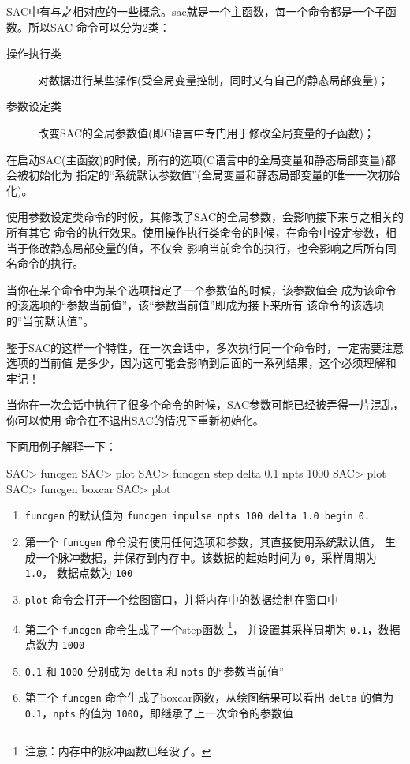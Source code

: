 SAC中有与之相对应的一些概念。sac就是一个主函数，每一个命令都是一个子函数。所以SAC
命令可以分为2类：
\begin{description}
\item[操作执行类] 对数据进行某些操作(受全局变量控制，同时又有自己的静态局部变量)；
\item[参数设定类] 改变SAC的全局参数值(即C语言中专门用于修改全局变量的子函数)；
\end{description}

在启动SAC(主函数)的时候，所有的选项(C语言中的全局变量和静态局部变量)都会被初始化为
指定的``系统默认参数值''(全局变量和静态局部变量的唯一一次初始化)。

使用参数设定类命令的时候，其修改了SAC的全局参数，会影响接下来与之相关的所有其它
命令的执行效果。使用操作执行类命令的时候，在命令中设定参数，相当于修改静态局部变量的值，不仅会
影响当前命令的执行，也会影响之后所有同名命令的执行。

当你在某个命令中为某个选项指定了一个参数值的时候，该参数值会
成为该命令的该选项的``参数当前值''，该``参数当前值''即成为接下来所有
该命令的该选项的``当前默认值''。

鉴于SAC的这样一个特性，在一次会话中，多次执行同一个命令时，一定需要注意选项的当前值
是多少，因为这可能会影响到后面的一系列结果，这个必须理解和牢记！

\begin{note}
当你在一次会话中执行了很多个命令的时候，SAC参数可能已经被弄得一片混乱，
你可以使用  命令在不退出SAC的情况下重新初始化。
\end{note}

下面用例子解释一下：
\begin{SACCode}
SAC> funcgen
SAC> plot
SAC> funcgen step delta 0.1 npts 1000
SAC> plot
SAC> funcgen boxcar
SAC> plot
\end{SACCode}

\begin{enumerate}
\item \texttt{funcgen} 的默认值为 \texttt{funcgen impulse npts 100 delta 1.0 begin 0.}
\item 第一个 \texttt{funcgen} 命令没有使用任何选项和参数，其直接使用系统默认值，
    生成一个脉冲数据，并保存到内存中。该数据的起始时间为 \texttt{0}，采样周期为 \texttt{1.0}，
    数据点数为 \texttt{100}
\item \texttt{plot} 命令会打开一个绘图窗口，并将内存中的数据绘制在窗口中
\item 第二个 \texttt{funcgen} 命令生成了一个step函数
    \footnote{注意：内存中的脉冲函数已经没了。}，
    并设置其采样周期为 \texttt{0.1}，数据点数为 \texttt{1000}
\item \texttt{0.1} 和 \texttt{1000} 分别成为 \texttt{delta} 和 \texttt{npts} 的``参数当前值''
\item 第三个 \texttt{funcgen} 命令生成了boxcar函数，从绘图结果可以看出 \texttt{delta} 的值为
    \texttt{0.1}，\texttt{npts} 的值为 \texttt{1000}，即继承了上一次命令的参数值
\end{enumerate}
